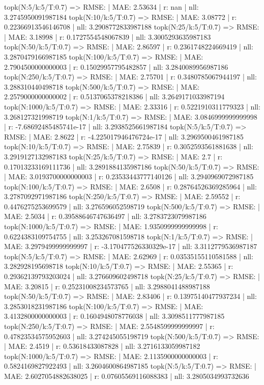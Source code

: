 topk(N:5/k:5/T:0.7) => RMSE: | MAE: 2.53634 | r: nan | nll: 3.2745950091987184
topk(N:10/k:5/T:0.7) => RMSE: | MAE: 3.08772 | r: 0.22366913546146708 | nll: 3.2908772833987188
topk(N:25/k:5/T:0.7) => RMSE: | MAE: 3.18998 | r: 0.1727554548067839 | nll: 3.3005293635987183
topk(N:50/k:5/T:0.7) => RMSE: | MAE: 2.86597 | r: 0.2361748224669419 | nll: 3.2870479166987185
topk(N:100/k:5/T:0.7) => RMSE: | MAE: 2.7904500000000003 | r: 0.15029957795482857 | nll: 3.2840089956987186
topk(N:250/k:5/T:0.7) => RMSE: | MAE: 2.75701 | r: 0.3480785067944197 | nll: 3.288310440498718
topk(N:500/k:5/T:0.7) => RMSE: | MAE: 2.2579000000000002 | r: 0.5137065378218386 | nll: 3.2649171033987194
topk(N:1000/k:5/T:0.7) => RMSE: | MAE: 2.33316 | r: 0.5221910311779323 | nll: 3.268127321998719
topk(N:1/k:5/T:0.7) => RMSE: | MAE: 3.0846999999999998 | r: -7.68692485485741e-17 | nll: 3.2938525661987184
topk(N:5/k:5/T:0.7) => RMSE: | MAE: 2.8622 | r: -4.225017946476724e-17 | nll: 3.2969500461987185
topk(N:10/k:5/T:0.7) => RMSE: | MAE: 2.75839 | r: 0.3052593561881638 | nll: 3.2919127132987183
topk(N:25/k:5/T:0.7) => RMSE: | MAE: 2.7 | r: 0.17013233169111736 | nll: 3.2891884135987186
topk(N:50/k:5/T:0.7) => RMSE: | MAE: 3.0193700000000003 | r: 0.23533443777140126 | nll: 3.2940969072987185
topk(N:100/k:5/T:0.7) => RMSE: | MAE: 2.6508 | r: 0.28764526369285964 | nll: 3.2787092971987186
topk(N:250/k:5/T:0.7) => RMSE: | MAE: 2.59552 | r: 0.4476275253699579 | nll: 3.276596052598719
topk(N:500/k:5/T:0.7) => RMSE: | MAE: 2.5034 | r: 0.39588646747636497 | nll: 3.2783723079987186
topk(N:1000/k:5/T:0.7) => RMSE: | MAE: 1.9350999999999998 | r: 0.6224383109754755 | nll: 3.253267081598718
topk(N:1/k:5/T:0.7) => RMSE: | MAE: 3.2979499999999997 | r: -3.170477526330329e-17 | nll: 3.3112779536987187
topk(N:5/k:5/T:0.7) => RMSE: | MAE: 2.62969 | r: 0.03535155110581588 | nll: 3.282928195698718
topk(N:10/k:5/T:0.7) => RMSE: | MAE: 2.55365 | r: 0.29362139793203024 | nll: 3.276609602498718
topk(N:25/k:5/T:0.7) => RMSE: | MAE: 3.20815 | r: 0.25231008234573765 | nll: 3.2988041488987188
topk(N:50/k:5/T:0.7) => RMSE: | MAE: 2.83406 | r: 0.13975140477937234 | nll: 3.2853018231987186
topk(N:100/k:5/T:0.7) => RMSE: | MAE: 3.4132800000000003 | r: 0.1604948078776038 | nll: 3.3098511777987185
topk(N:250/k:5/T:0.7) => RMSE: | MAE: 2.5548599999999997 | r: 0.47823534575952603 | nll: 3.274245055198719
topk(N:500/k:5/T:0.7) => RMSE: | MAE: 2.4519 | r: 0.53618433087828 | nll: 3.2716133059987182
topk(N:1000/k:5/T:0.7) => RMSE: | MAE: 2.1135900000000003 | r: 0.5824169827922493 | nll: 3.2604600864987185
topk(N:5/k:5/T:0.7) => RMSE: | MAE: 2.6027054882638025 | r: 0.07605569116088383 | nll: 3.2805034993732636
